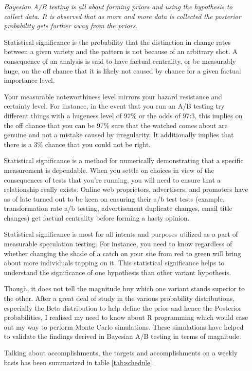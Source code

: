 \emph{Bayesian A/B testing is all about forming priors and using the hypothesis to collect data. It is observed that as more and more data is collected the posterior probability gets further away from the priors.} \par
\newline
Statistical significance is the probability that the distinction in change rates between a given variety and the pattern is not because of an arbitrary shot. A consequence of an analysis is said to have factual centrality, or be measurably huge, on the off chance that it is likely not caused by chance for a given factual importance level.\par
Your measurable noteworthiness level mirrors your hazard resistance and certainty level. For instance, in the event that you run an A/B testing try different things with a hugeness level of 97\% or the odds of 97:3, this implies on the off chance that you can be 97\% sure that the watched comes about are genuine and not a mistake caused by irregularity. It additionally implies that there is a 3\% chance that you could not be right. \par
Statistical significance is a method for numerically demonstrating that a specific measurement is dependable. When you settle on choices in view of the consequences of tests that you're running, you will need to ensure that a relationship really exists. Online web proprietors, advertisers, and promoters have as of late turned out to be keen on ensuring their a/b test tests (example, transformation rate a/b testing, advertisement duplicate changes, email title changes) get factual centrality before forming a hasty opinion. \par
Statistical significance is most for all intents and purposes utilized as a part of measurable speculation testing. For instance, you need to know regardless of whether changing the shade of a catch on your site from red to green will bring about more individuals tapping on it. This statistical significance helps to understand the significance of one hypothesis than other variant hypothesis. \par Though, it does not tell the magnitude buy which one variant stands superior to the other. After a great deal of study in the various probability distributions, especially the Beta distribution to help define the prior and hence the Posterior probabilities, I realised my need to know about R programming which would ease out my way to perform Monte Carlo simulations. These simulations have helped to validate the findings derived in Bayesian A/B testing in terms of magnitude. \par
\newpage
Talking about accomplishments, the targets and accomplishments on a weekly basis has been summarized in table \ref{tab:schedule}.

